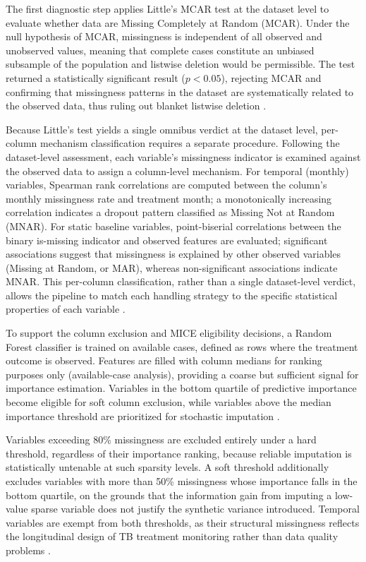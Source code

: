 \documentclass[12pt]{article}
\begin{document}
The first diagnostic step applies Little's MCAR test at the dataset level to evaluate whether data are Missing Completely at Random (MCAR). Under the null hypothesis of MCAR, missingness is independent of all observed and unobserved values, meaning that complete cases constitute an unbiased subsample of the population and listwise deletion would be permissible. The test returned a statistically significant result ($p < 0.05$), rejecting MCAR and confirming that missingness patterns in the dataset are systematically related to the observed data, thus ruling out blanket listwise deletion \citep{ref32}.

Because Little's test yields a single omnibus verdict at the dataset level, per-column mechanism classification requires a separate procedure. Following the dataset-level assessment, each variable's missingness indicator is examined against the observed data to assign a column-level mechanism. For temporal (monthly) variables, Spearman rank correlations are computed between the column's monthly missingness rate and treatment month; a monotonically increasing correlation indicates a dropout pattern classified as Missing Not at Random (MNAR). For static baseline variables, point-biserial correlations between the binary is-missing indicator and observed features are evaluated; significant associations suggest that missingness is explained by other observed variables (Missing at Random, or MAR), whereas non-significant associations indicate MNAR. This per-column classification, rather than a single dataset-level verdict, allows the pipeline to match each handling strategy to the specific statistical properties of each variable \citep{ref31, ref32}.

To support the column exclusion and MICE eligibility decisions, a Random Forest classifier is trained on available cases, defined as rows where the treatment outcome is observed. Features are filled with column medians for ranking purposes only (available-case analysis), providing a coarse but sufficient signal for importance estimation. Variables in the bottom quartile of predictive importance become eligible for soft column exclusion, while variables above the median importance threshold are prioritized for stochastic imputation \citep{ref35}.

Variables exceeding 80\% missingness are excluded entirely under a hard threshold, regardless of their importance ranking, because reliable imputation is statistically untenable at such sparsity levels. A soft threshold additionally excludes variables with more than 50\% missingness whose importance falls in the bottom quartile, on the grounds that the information gain from imputing a low-value sparse variable does not justify the synthetic variance introduced. Temporal variables are exempt from both thresholds, as their structural missingness reflects the longitudinal design of TB treatment monitoring rather than data quality problems \citep{ref37}.
\end{document}
